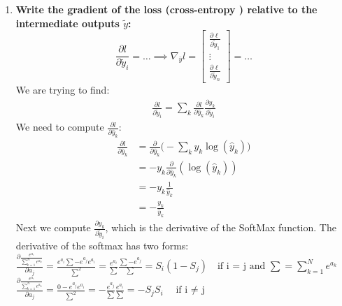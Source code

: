\documentclass[12pt,a4paper]{article}
\begin{document}
\begin{enumerate}[resume]
    \item \textbf{Write the gradient of the loss (cross-entropy ) relative to the intermediate outputs $\tilde{y}$:
    $$ \frac{\partial l}{\partial \tilde{y}_i} = \dots \implies \nabla_{\bar{y}} l =  
    \begin{bmatrix}
    \frac{\partial \ell}{\partial \tilde{y}_1} \\
    \vdots \\
    \frac{\partial \ell}{\partial \tilde{y}_n}
    \end{bmatrix}
    = \dots$$} \newline
    We are trying to find:
    \begin{align*}
        \frac{\partial l}{\partial \tilde{y}_i} = \sum_{k} \frac{\partial l}{\partial \hat{y}_k}  \frac{\partial \hat{y}_k}{\partial \tilde{y}_i}
    \end{align*}
    We need to compute $ \frac{\partial l}{\partial \hat{y}_k} $:
    \begin{align*}
        \frac{\partial l}{\partial \hat{y}_k} &= \frac{\partial}{\partial \hat{y}_k} \Big(- \sum_{k} y_k \log(\hat{y}_k)\Big) \\
        &= - y_k \frac{\partial}{\partial \hat{y}_k} (\log(\hat{y}_k)) \\
        &= - y_k \frac{1}{\hat{y}_k} \\
        &= - \frac{y_k}{\hat{y}_k}
    \end{align*}
    Next we compute $ \frac{\partial \hat{y}_k}{\partial \tilde{y}_i} $, which is the derivative of the SoftMax function. \newline
    The derivative of the softmax has two forms: \newline
    $ \frac{\partial \frac{e^{a_i}}{\sum_{k=1}^{N} e^{a_k}}}{\partial a_j} 
    = \frac{e^{a_i}\sum - e^{a_j}e^{a_i}}{\sum^2} 
    = \frac{e^{a_i}}{\sum} \frac{\sum - e^{a_j}}{\sum} = S_i(1 - S_j)
    \quad \text{if i = j and } \sum = \sum_{k=1}^{N} e^{a_k} 
    $
    \newline
    $ \frac{\partial \frac{e^{a_i}}{\sum_{k=1}^{N} e^{a_k}}}{\partial a_j} 
    = \frac{0 - e^{a_j}e^{a_i}}{\sum^2} 
    = - \frac{e^{a_j}}{\sum} \frac{e^{a_i}}{\sum} = -S_j S_i
    \quad \text{if i $\neq$ j}
    $ \newline
    


\end{enumerate}
\end{document}
